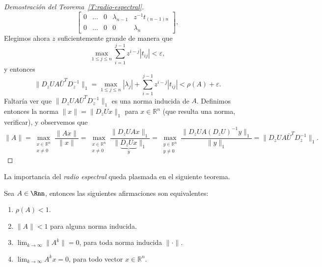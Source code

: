 \begin{proof}[Demostración del Teorema~\ref{T:radio-espectral}]
\[\begin{bmatrix}
    0       & \dots  & 0      & \lambda_{n-1} & z^{-1}t_{(n-1)n}\\
    0       & \dots  & 0      & 0     & \lambda_n
  \end{bmatrix},
  \]
  Elegimos ahora $z$ suficientemente grande de manera que
  \[
  \max_{1\le j \le n} \sum_{i=1}^{j-1} z^{i-j} |t_{ij}| < \varepsilon,
  \]
  y entonces
  \[
  \| D_z  U A \bar U^T D_z^{-1} \|_1
  = \max_{1\le j \le n} |\lambda_j| + \sum_{i=1}^{j-1} z^{i-j} |t_{ij}|
  < \rho(A) + \varepsilon.
  \]
  Faltaría ver que $\| D_z  U A \bar U^T D_z^{-1} \|_1$ es una norma inducida de $A$. Definimos entonces la norma $\| x \| = \| D_z U x \|_1$ para $x \in \mathbb{R}^n$ (que resulta una norma, verificar), y observemos que
  \[
  \| A \| = \max_{\substack{x\in\mathbb{R}^n\\x\neq 0}} \frac{\|Ax\|}{\|x\|}
  = \max_{\substack{x\in\mathbb{R}^n\\x\neq 0}} \frac{\|D_z U Ax\|_1}{\|\underbrace{D_z U x}_{y}\|_1}
  = \max_{\substack{y\in\mathbb{R}^n\\y\neq 0}} \frac{\|D_z U A (D_z U)^{-1} y\|_1}{\|y\|_1}
  = \| D_z U A \bar U^T D_z^{-1} \|_1 .
  \]
\end{proof}

La importancia del \emph{radio espectral} queda plasmada en el siguiente teorema.

\begin{thm}\label{T:equivalencia-radio-espectral}
  Sea $A\in\Rnn$, entonces las siguientes afirmaciones son equivalentes:
  \begin{enumerate}[label=\textup{(\alph*)}]
  \item $\rho(A) < 1$.
  \item $\|A \|<1$ para alguna norma inducida.
  \item $\displaystyle \lim_{k \to\infty} \|A^k\| = 0$, para toda norma inducida $\| \cdot \|$.
  \item $\displaystyle \lim_{k\to\infty} A^k x = 0$, para todo vector $x \in \mathbb{R}^n$.
  \end{enumerate}
\end{thm}


